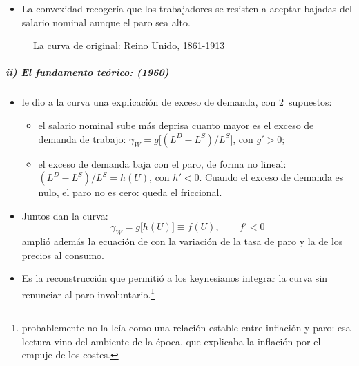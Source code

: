 \documentclass[11pt]{article}
\begin{document}
\begin{itemize}
\begin{itemize}
  \item \emph{el ritmo al que cambia el paro} (el «límite de velocidad»): los salarios suben más cuando el paro está bajando que cuando, al mismo nivel, está subiendo, y por eso los datos dan vueltas alrededor de la curva;
  \item \emph{el coste de la vida}: cuando los precios de importación suben mucho, los trabajadores piden más salario.
  \end{itemize}
\item La convexidad recogería que los trabajadores se resisten a aceptar bajadas del salario nominal aunque el paro sea alto.
\end{itemize}

\begin{figure}[H]
\centering
\caption{La curva de  original: Reino Unido, 1861-1913}\label{fig:phillips-original}
\end{figure}

\subparagraph{ii) El fundamento teórico:  (1960)}

\begin{itemize}
\item \textcite{Lipsey1960Relation} le dio a la curva una explicación de exceso de demanda, con 2~supuestos:
  \begin{itemize}
  \item el salario nominal sube más deprisa cuanto mayor es el exceso de demanda de trabajo: $\gamma_W=g\big[(L^D-L^S)/L^S\big]$, con $g'>0$;
  \item el exceso de demanda baja con el paro, de forma no lineal: $(L^D-L^S)/L^S=h(U)$, con $h'<0$. Cuando el exceso de demanda es nulo, el paro no es cero: queda el friccional.
  \end{itemize}
\item Juntos dan la curva:
  \begin{equation}
  \gamma_W=g\big[h(U)\big]\equiv f(U),\qquad f'<0 \label{eq:lipsey}
  \end{equation}
   amplió además la ecuación de  con la variación de la tasa de paro y la de los precios al consumo.
\item Es la reconstrucción que permitió a los keynesianos integrar la curva sin renunciar al paro involuntario\nocite{DeVroey2016History}.\footnote{ probablemente no la leía como una relación estable entre inflación y paro: esa lectura vino del ambiente de la época, que explicaba la inflación por el empuje de los costes\nocite{DeVroey2016History}.}
\end{itemize}
\end{document}
